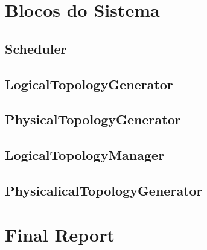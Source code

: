 \section{Blocos do Sistema}

\subsection{Scheduler}

\subsection{LogicalTopologyGenerator}

\subsection{PhysicalTopologyGenerator}

\subsection{LogicalTopologyManager}

\subsection{PhysicalicalTopologyGenerator}

\section{Final Report}
\label{fr}



\cleardoublepage